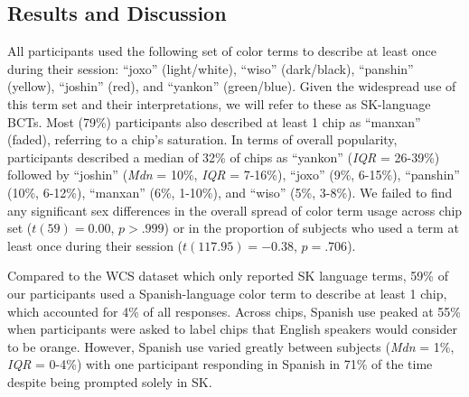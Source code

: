 \documentclass[
  english,
  ,man,floatsintext]{apa6}
\begin{document}
\hypertarget{results-and-discussion}{%
\subsection{Results and Discussion}\label{results-and-discussion}}

All participants used the following set of color terms to describe at least once during their session: \enquote{joxo} (light/white), \enquote{wiso} (dark/black), \enquote{panshin} (yellow), \enquote{joshin} (red), and \enquote{yankon} (green/blue). Given the widespread use of this term set and their interpretations, we will refer to these as SK-language BCTs. Most (79\%) participants also described at least 1 chip as \enquote{manxan} (faded), referring to a chip's saturation. In terms of overall popularity, participants described a median of 32\% of chips as \enquote{yankon} (\emph{IQR} = 26-39\%) followed by \enquote{joshin} (\emph{Mdn} = 10\%, \emph{IQR} = 7-16\%), \enquote{joxo} (9\%, 6-15\%), \enquote{panshin} (10\%, 6-12\%), \enquote{manxan} (6\%, 1-10\%), and \enquote{wiso} (5\%, 3-8\%). We failed to find any significant sex differences in the overall spread of color term usage across chip set (\(t(59) = 0.00\), \(p > .999\)) or in the proportion of subjects who used a term at least once during their session (\(t(117.95) = -0.38\), \(p = .706\)).

Compared to the WCS dataset which only reported SK language terms, 59\% of our participants used a Spanish-language color term to describe at least 1 chip, which accounted for 4\% of all responses. Across chips, Spanish use peaked at 55\% when participants were asked to label chips that English speakers would consider to be orange. However, Spanish use varied greatly between subjects (\emph{Mdn} = 1\%, \emph{IQR} = 0-4\%) with one participant responding in Spanish in 71\% of the time despite being prompted solely in SK.
\end{document}
